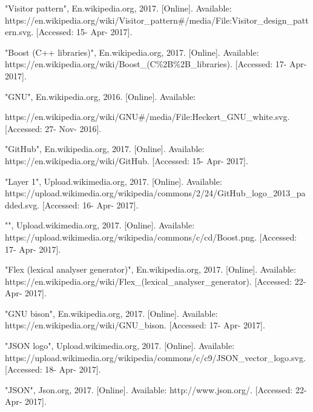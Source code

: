 \begin{thebibliography}{22}
 \bibitem{} "Visitor pattern", En.wikipedia.org, 2017. [Online]. Available: https://en.wikipedia.org/wiki/Visitor\_pattern\#/media/File:Visitor\_design\_pattern.svg. [Accessed: 15- Apr- 2017].

 \bibitem{} "Boost (C++ libraries)", En.wikipedia.org, 2017. [Online]. Available: https://en.wikipedia.org/wiki/Boost\_(C\%2B\%2B\_libraries). [Accessed: 17- Apr- 2017].
 
 \bibitem{} "GNU", En.wikipedia.org, 2016. [Online]. Available: 
 
 https://en.wikipedia.org/wiki/GNU\#/media/File:Heckert\_GNU\_white.svg. [Accessed: 27- Nov- 2016].
 
 \bibitem{} "GitHub", En.wikipedia.org, 2017. [Online]. Available: https://en.wikipedia.org/wiki/GitHub. [Accessed: 15- Apr- 2017].

\bibitem{} "Layer 1", Upload.wikimedia.org, 2017. [Online]. Available: https://upload.wikimedia.org/wikipedia/commons/2/24/GitHub\_logo\_2013\_padded.svg. [Accessed: 16- Apr- 2017].
 
\bibitem{} "", Upload.wikimedia.org, 2017. [Online]. Available: https://upload.wikimedia.org/wikipedia/commons/c/cd/Boost.png. [Accessed: 17- Apr- 2017].

\bibitem{} "Flex (lexical analyser generator)", En.wikipedia.org, 2017. [Online]. Available: https://en.wikipedia.org/wiki/Flex\_(lexical\_analyser\_generator). [Accessed: 22- Apr- 2017].

\bibitem{} "GNU bison", En.wikipedia.org, 2017. [Online]. Available: https://en.wikipedia.org/wiki/GNU\_bison. [Accessed: 17- Apr- 2017].

\bibitem{} "JSON logo", Upload.wikimedia.org, 2017. [Online]. Available: https://upload.wikimedia.org/wikipedia/commons/c/c9/JSON\_vector\_logo.svg. [Accessed: 18- Apr- 2017].

\bibitem{} "JSON", Json.org, 2017. [Online]. Available: http://www.json.org/. [Accessed: 22- Apr- 2017].

\end{thebibliography}